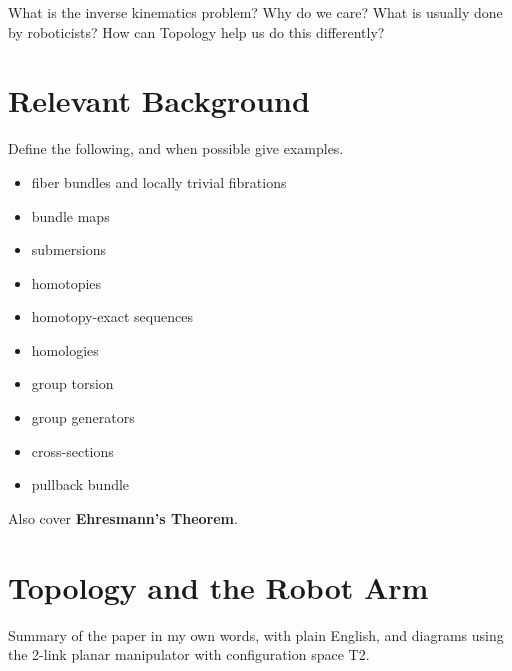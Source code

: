 \documentclass[12pt]{article}
\theoremstyle{definition}
\begin{document}
What is the inverse kinematics problem? Why do we care? What is usually done by
roboticists? How can Topology help us do this differently?

\section{Relevant Background}
Define the following, and when possible give examples.
\begin{itemize}
    \item fiber bundles and locally trivial fibrations
    \item bundle maps
    \item submersions
    \item homotopies
    \item homotopy-exact sequences
    \item homologies
    \item group torsion
    \item group generators
    \item cross-sections
    \item pullback bundle
\end{itemize}
Also cover \textbf{Ehresmann's Theorem}.

\section{Topology and the Robot Arm}
Summary of the paper in my own words, with plain English, and diagrams using the
2-link planar manipulator with configuration space T2.
\printbibliography
\end{document}

